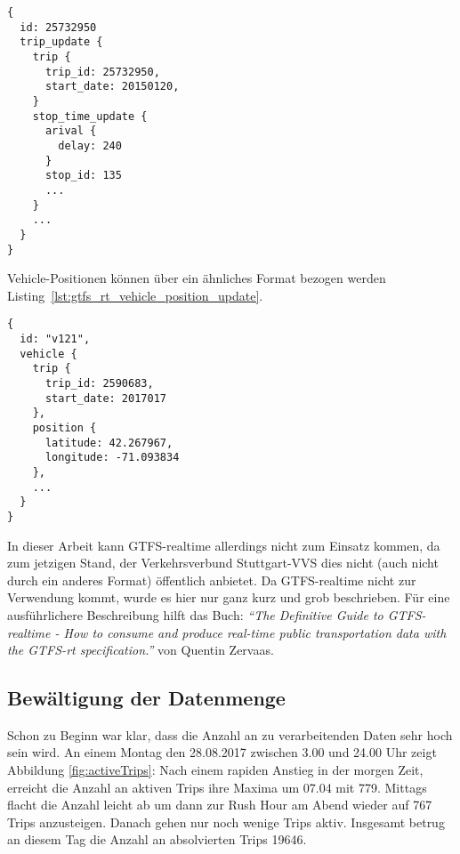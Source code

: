 \begin{newpage}
        \begin{lstlisting}[captionpos=b, caption={Auszug eines GTFS-realtime Trip Updates von MBTA},label={lst:gtfs_rt_trip_update}]
{
  id: 25732950
  trip_update {
    trip {
      trip_id: 25732950,
      start_date: 20150120,
    }
    stop_time_update {
      arival {
        delay: 240
      }
      stop_id: 135
      ...
    }
    ...
  }
}
      \end{lstlisting}

      Vehicle-Positionen können über ein ähnliches Format bezogen werden Listing~\ref{lst:gtfs_rt_vehicle_position_update}.

      \begin{lstlisting}[captionpos={b},caption={Auszug eines GTFS-realtime Vehicle-Position Updates von MBTA},label={lst:gtfs_rt_vehicle_position_update}]
{
  id: "v121",
  vehicle {
    trip {
      trip_id: 2590683,
      start_date: 2017017
    },
    position {
      latitude: 42.267967,
      longitude: -71.093834
    },
    ...
  }
}
      \end{lstlisting}

      In dieser Arbeit kann GTFS-realtime allerdings nicht zum Einsatz kommen, da zum jetzigen Stand, der Verkehrsverbund Stuttgart-VVS dies nicht (auch nicht durch ein anderes Format) öffentlich anbietet. Da GTFS-realtime nicht zur Verwendung kommt, wurde es hier nur ganz kurz und grob beschrieben. Für eine ausführlichere Beschreibung hilft das Buch: \textit{"`The Definitive Guide to GTFS-realtime - How to consume and produce real-time public transportation data with the GTFS-rt specification."'}\parencite{zervaas_realtime} von Quentin Zervaas.\\


    \subsection{Bewältigung der Datenmenge}
    \label{sub:bewältigung_der_datenmenge}
      Schon zu Beginn war klar, dass die Anzahl an zu verarbeitenden Daten sehr hoch sein wird. An einem Montag den 28.08.2017 zwischen 3.00 und 24.00 Uhr zeigt Abbildung \ref{fig:activeTrips}: Nach einem rapiden Anstieg in der morgen Zeit, erreicht die Anzahl an aktiven Trips ihre Maxima um 07.04 mit 779. Mittags flacht die Anzahl leicht ab um dann zur Rush Hour am Abend wieder auf 767 Trips anzusteigen. Danach gehen nur noch wenige Trips aktiv. Insgesamt betrug an diesem Tag die Anzahl an absolvierten Trips 19646.


\end{newpage}
